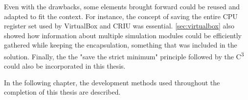 {Even with the drawbacks, some elements brought forward could be reused and adapted to fit the context. For instance, the concept of saving the entire CPU register set used by VirtualBox and CRIU was essential. \autoref{sec:virtualbox} also showed how information about multiple simulation modules could be efficiently gathered while keeping the encapsulation, something that was included in the solution. Finally, the the "save the strict minimum" principle followed by the C\textsuperscript{3} could  also be incorporated in this thesis. 

In the following chapter, the development methods used throughout the completion of this thesis are described. 

}